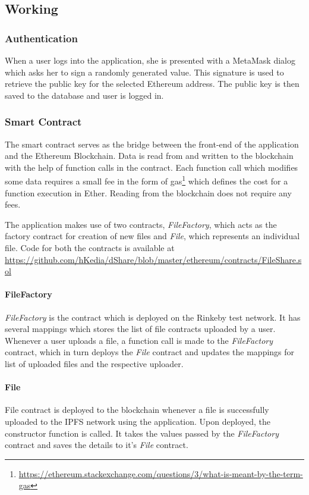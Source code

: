 		\subsection{Working}
			\subsubsection{Authentication}
				When a user logs into the application, she is presented with a MetaMask dialog which asks her to sign a randomly generated value. This signature is used to retrieve the public key for the selected Ethereum address. The public key is then saved to the database and user is logged in.
			
			\subsubsection{Smart Contract}
				The smart contract serves as the bridge between the front-end of the application and the Ethereum Blockchain. Data is read from and written to the blockchain with the help of function calls in the contract. Each function call which modifies some data requires a small fee in the form of gas\footnote{\url{https://ethereum.stackexchange.com/questions/3/what-is-meant-by-the-term-gas}} which defines the cost for a function execution in Ether. Reading from the blockchain does not require any fees.
				
				The application makes use of two contracts, \textit{FileFactory}, which acts as the factory contract for creation of new files and \textit{File}, which represents an individual file. Code for both the contracts is available at \url{https://github.com/hKedia/dShare/blob/master/ethereum/contracts/FileShare.sol}
				
				\paragraph{FileFactory}
				\textit{FileFactory} is the contract which is deployed on the Rinkeby test network. It has several mappings which stores the list of file contracts uploaded by a user. Whenever a user uploads a file, a function call is made to the \textit{FileFactory} contract, which in turn deploys the \textit{File} contract and updates the mappings for list of uploaded files and the respective uploader.
				
				\paragraph{File}
				File contract is deployed to the blockchain whenever a file is successfully uploaded to the IPFS network using the application. Upon deployed, the constructor function is called. It takes the values passed by the \textit{FileFactory} contract and saves the details to it’s \textit{File} contract.
			
